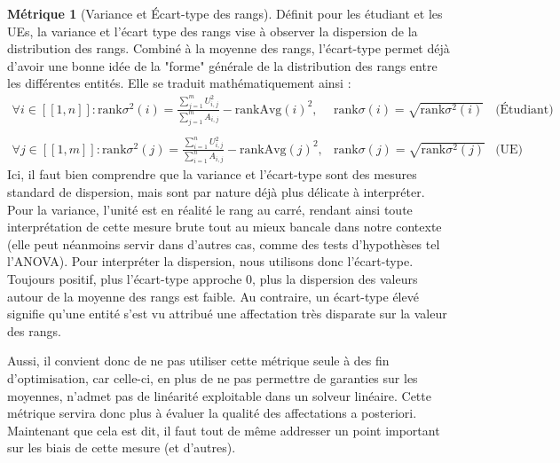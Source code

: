 \documentclass{rapport}
\theoremstyle{definition}
\theoremstyle{remark}
\theoremstyle{definition}
\newtheorem*{metric}{Métrique}
\theoremstyle{remark}
\newcommand{\llbracket}{[\![}
\newcommand{\rrbracket}{]\!]}
\begin{document}
\begin{metric}[Variance et Écart-type des rangs]
    Définit pour les étudiant et les UEs, la variance et l'écart type des rangs vise à observer la dispersion de la distribution des rangs. Combiné à la moyenne des rangs, l'écart-type permet déjà d'avoir une bonne idée de la "forme" générale de la distribution des rangs entre les différentes entités.
    Elle se traduit mathématiquement ainsi :
    $$
    \begin{matrix}
        \forall i\in\llbracket 1, n\rrbracket : \text{rank}\sigma^2(i) = \frac{\sum_{j=1}^m U_{i,j}^2}{\sum_{j=1}^m A_{i,j}} - \text{rankAvg}(i)^2, & \text{rank}\sigma(i) = \sqrt{\text{rank}\sigma^2(i)} & \text{(Étudiant)}\\
        &\\
        \forall j\in\llbracket 1, m\rrbracket : \text{rank}\sigma^2(j) = \frac{\sum_{i=1}^n U_{i,j}^2}{\sum_{i=1}^n A_{i,j}} - \text{rankAvg}(j)^2, & \text{rank}\sigma(j) = \sqrt{\text{rank}\sigma^2(j)} & \text{(UE)}
    \end{matrix}
    $$
    Ici, il faut bien comprendre que la variance et l'écart-type sont des mesures standard de dispersion, mais sont par nature déjà plus délicate à interpréter. Pour la variance, l'unité est en réalité le rang au carré, rendant ainsi toute interprétation de cette mesure brute tout au mieux bancale dans notre contexte (elle peut néanmoins servir dans d'autres cas, comme des tests d'hypothèses tel l'ANOVA).
    Pour interpréter la dispersion, nous utilisons donc l'écart-type. Toujours positif, plus l'écart-type approche 0, plus la dispersion des valeurs autour de la moyenne des rangs est faible. Au contraire, un écart-type élevé signifie qu'une entité s'est vu attribué une affectation très disparate sur la valeur des rangs.

    Aussi, il convient donc de ne pas utiliser cette métrique seule à des fin d'optimisation, car celle-ci, en plus de ne pas permettre de garanties sur les moyennes, n'admet pas de linéarité exploitable dans un solveur linéaire. Cette métrique servira donc plus à évaluer la qualité des affectations a posteriori. Maintenant que cela est dit, il faut tout de même addresser un point important sur les biais de cette mesure (et d'autres).
\end{metric}
\end{document}
